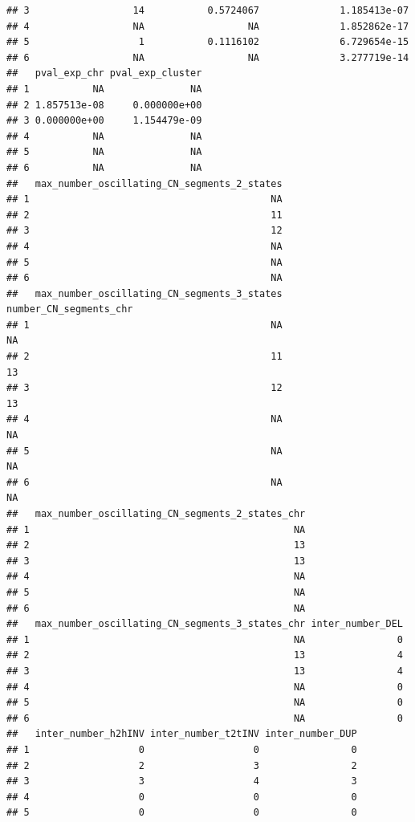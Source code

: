 \documentclass[twoside,a4wide,11pt]{article}\usepackage[]{graphicx}\usepackage[]{color}
\makeatletter
\newenvironment{kframe}{%
 \def\at@end@of@kframe{}%
 \ifinner\ifhmode%
  \def\at@end@of@kframe{\end{minipage}}%
  \begin{minipage}{\columnwidth}%
 \fi\fi%
 \def\FrameCommand##1{\hskip\@totalleftmargin \hskip-\fboxsep
 \colorbox{shadecolor}{##1}\hskip-\fboxsep
     \hskip-\linewidth \hskip-\@totalleftmargin \hskip\columnwidth}%
 \MakeFramed {\advance\hsize-\width
   \@totalleftmargin\z@ \linewidth\hsize
   \@setminipage}}%
 {\par\unskip\endMakeFramed%
 \at@end@of@kframe}
\newenvironment{knitrout}{}{} %
\makeatother
\begin{document}
\begin{knitrout}
\begin{kframe}
\begin{verbatim}
## 3                  14           0.5724067              1.185413e-07
## 4                  NA                  NA              1.852862e-17
## 5                   1           0.1116102              6.729654e-15
## 6                  NA                  NA              3.277719e-14
##   pval_exp_chr pval_exp_cluster
## 1           NA               NA
## 2 1.857513e-08     0.000000e+00
## 3 0.000000e+00     1.154479e-09
## 4           NA               NA
## 5           NA               NA
## 6           NA               NA
##   max_number_oscillating_CN_segments_2_states
## 1                                          NA
## 2                                          11
## 3                                          12
## 4                                          NA
## 5                                          NA
## 6                                          NA
##   max_number_oscillating_CN_segments_3_states number_CN_segments_chr
## 1                                          NA                     NA
## 2                                          11                     13
## 3                                          12                     13
## 4                                          NA                     NA
## 5                                          NA                     NA
## 6                                          NA                     NA
##   max_number_oscillating_CN_segments_2_states_chr
## 1                                              NA
## 2                                              13
## 3                                              13
## 4                                              NA
## 5                                              NA
## 6                                              NA
##   max_number_oscillating_CN_segments_3_states_chr inter_number_DEL
## 1                                              NA                0
## 2                                              13                4
## 3                                              13                4
## 4                                              NA                0
## 5                                              NA                0
## 6                                              NA                0
##   inter_number_h2hINV inter_number_t2tINV inter_number_DUP
## 1                   0                   0                0
## 2                   2                   3                2
## 3                   3                   4                3
## 4                   0                   0                0
## 5                   0                   0                0

\end{verbatim}
\end{kframe}
\end{knitrout}
\end{document}
